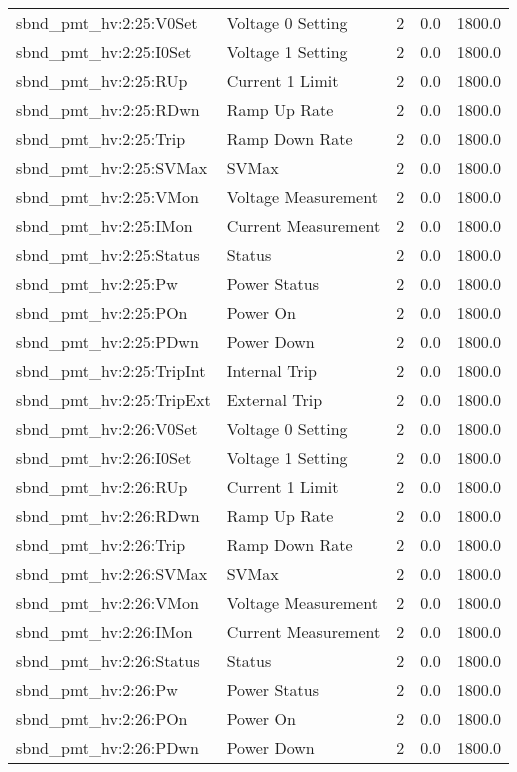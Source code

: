 \begin{center}
\begin{longtable}{l | l l l l }
sbnd\_pmt\_hv:2:25:V0Set & Voltage 0 Setting & 2 & 0.0 & 1800.0\\ 
sbnd\_pmt\_hv:2:25:I0Set & Voltage 1 Setting & 2 & 0.0 & 1800.0\\ 
sbnd\_pmt\_hv:2:25:RUp & Current 1 Limit & 2 & 0.0 & 1800.0\\ 
sbnd\_pmt\_hv:2:25:RDwn & Ramp Up Rate & 2 & 0.0 & 1800.0\\ 
sbnd\_pmt\_hv:2:25:Trip & Ramp Down Rate & 2 & 0.0 & 1800.0\\ 
sbnd\_pmt\_hv:2:25:SVMax & SVMax & 2 & 0.0 & 1800.0\\ 
sbnd\_pmt\_hv:2:25:VMon & Voltage Measurement & 2 & 0.0 & 1800.0\\ 
sbnd\_pmt\_hv:2:25:IMon & Current Measurement & 2 & 0.0 & 1800.0\\ 
sbnd\_pmt\_hv:2:25:Status & Status & 2 & 0.0 & 1800.0\\ 
sbnd\_pmt\_hv:2:25:Pw & Power Status & 2 & 0.0 & 1800.0\\ 
sbnd\_pmt\_hv:2:25:POn & Power On & 2 & 0.0 & 1800.0\\ 
sbnd\_pmt\_hv:2:25:PDwn & Power Down & 2 & 0.0 & 1800.0\\ 
sbnd\_pmt\_hv:2:25:TripInt & Internal Trip & 2 & 0.0 & 1800.0\\ 
sbnd\_pmt\_hv:2:25:TripExt & External Trip & 2 & 0.0 & 1800.0\\ 
sbnd\_pmt\_hv:2:26:V0Set & Voltage 0 Setting & 2 & 0.0 & 1800.0\\ 
sbnd\_pmt\_hv:2:26:I0Set & Voltage 1 Setting & 2 & 0.0 & 1800.0\\ 
sbnd\_pmt\_hv:2:26:RUp & Current 1 Limit & 2 & 0.0 & 1800.0\\ 
sbnd\_pmt\_hv:2:26:RDwn & Ramp Up Rate & 2 & 0.0 & 1800.0\\ 
sbnd\_pmt\_hv:2:26:Trip & Ramp Down Rate & 2 & 0.0 & 1800.0\\ 
sbnd\_pmt\_hv:2:26:SVMax & SVMax & 2 & 0.0 & 1800.0\\ 
sbnd\_pmt\_hv:2:26:VMon & Voltage Measurement & 2 & 0.0 & 1800.0\\ 
sbnd\_pmt\_hv:2:26:IMon & Current Measurement & 2 & 0.0 & 1800.0\\ 
sbnd\_pmt\_hv:2:26:Status & Status & 2 & 0.0 & 1800.0\\ 
sbnd\_pmt\_hv:2:26:Pw & Power Status & 2 & 0.0 & 1800.0\\ 
sbnd\_pmt\_hv:2:26:POn & Power On & 2 & 0.0 & 1800.0\\ 
sbnd\_pmt\_hv:2:26:PDwn & Power Down & 2 & 0.0 & 1800.0\\ 

\end{longtable}
\end{center}
